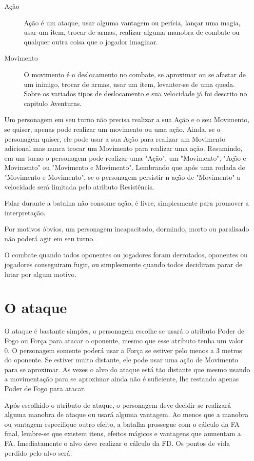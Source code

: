 \begin{description}
\item[Ação] Ação é um ataque, usar alguma vantagem ou perícia, lançar uma magia, usar um item, trocar de armas, realizar alguma manobra de combate ou qualquer outra coisa que o jogador imaginar.
\item[Movimento] O movimento é o deslocamento no combate, se aproximar ou se afastar de um inimigo, trocar de armas, usar um item, levanter-se de uma queda. Sobre os variados tipos de deslocamento e sua velocidade já foi descrito no capitulo Aventuras.
\end{description}

Um personagem em seu turno não precisa realizar a sua Ação e o seu Movimento, se quiser, apenas pode realizar um movimento ou uma ação. Ainda, se o personagem quiser, ele pode usar a sua Ação para realizar um Movimento adicional mas nunca trocar um Movimento para realizar uma ação. Resumindo, em um turno o personagem pode realizar uma "Ação", um "Movimento", "Ação e Movimento" ou "Movimento e Movimento". Lembrando que após uma rodada de "Movimento e Movimento", se o personagem persistir n ação de "Movimento" a velocidade será limitada pelo atributo Resistência.

Falar durante a batalha não consome ação, é livre, simplesmente para promover a interpretação.

Por motivos óbvios, um personagem incapacitado, dormindo, morto ou paralisado não poderá agir em seu turno.

O combate quando todos oponentes ou jogadores foram derrotados, oponentes ou jogadores conseguiram fugir, ou simplesmente quando todos decidiram parar de lutar por algum motivo.

\section{O ataque}

O ataque é bastante simples, o personagem escolhe se usará o atributo Poder de Fogo ou Força para atacar o oponente, mesmo que esse atributo tenha um valor 0. O personagem somente poderá usar a Força se estiver pelo menos a 3 metros do oponente. Se estiver muito distante, ele pode usar uma ação de Movimento para se aproximar. As vezes o alvo do ataque está tão distante que mesmo usando a movimentação para se aproximar ainda não é suficiente, lhe restando apenas Poder de Fogo para atacar. 

Após escolhido o atributo de ataque, o personagem deve decidir se realizará alguma manobra de ataque ou usará alguma vantagem. Ao menos que a manobra ou vantagem especifique outro efeito, a batalha prossegue com o cálculo da FA final, lembre-se que existem itens, efeitos mágicos e vantagens que aumentam a FA. Imediatamente o alvo deve realizar o cálculo da FD. Os pontos de vida perdido pelo alvo será:

